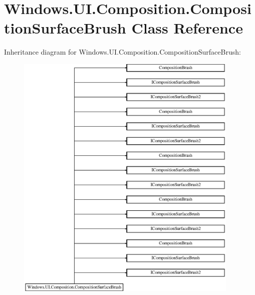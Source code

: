 \hypertarget{class_windows_1_1_u_i_1_1_composition_1_1_composition_surface_brush}{}\section{Windows.\+U\+I.\+Composition.\+Composition\+Surface\+Brush Class Reference}
\label{class_windows_1_1_u_i_1_1_composition_1_1_composition_surface_brush}
Inheritance diagram for Windows.\+U\+I.\+Composition.\+Composition\+Surface\+Brush\+:\begin{figure}[H]
\begin{center}
\leavevmode
\includegraphics[height=12.000000cm]{class_windows_1_1_u_i_1_1_composition_1_1_composition_surface_brush}
\end{center}
\end{figure}
